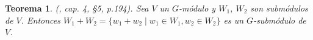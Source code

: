 \documentclass[12pt]{book}
\newtheorem{theorem}{Teorema}[section]
\theoremstyle{definition}
\newtheorem{definition}[theorem]{Definición}
\newcounter{in}
\newcounter{ini}
\begin{document}
\begin{theorem}{\normalfont (\cite{herstein1990algebra}, cap. 4, \S 5, p.194).}
  \label{suma-submodulo}
  Sea $V$ un $G$-módulo y $W_{1}$, $W_{2}$ son submódulos de
  $V$. Entonces $W_{1}+W_{2}=\{w_{1}+w_{2}\mid w_{1}\in W_{1},
  w_{2}\in W_{2}\}$ es un $G$-submódulo de $V$.
\end{theorem}




\end{document}
